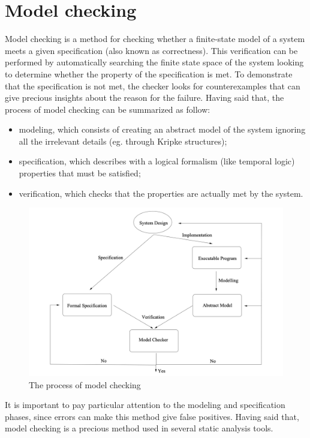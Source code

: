 \section{Model checking}
Model checking is a method for checking whether a finite-state model of a system meets a given specification (also known as correctness). This verification can be performed by automatically searching the finite state space of the system looking to determine whether the property of the specification is met. To demonstrate that the specification is not met, the checker looks for counterexamples that can give precious insights about the reason for the failure. Having said that, the process of model checking can be summarized as follow:
\begin{itemize}
  \item modeling, which consists of creating an abstract model of the system ignoring all the irrelevant details (eg. through Kripke structures);
  \item specification, which describes with a logical formalism (like temporal logic) properties that must be satisfied;
  \item verification, which checks that the properties are actually met by the system.
\end{itemize}
\begin{figure}[ht]
	\centering
	\includegraphics[width=1.0\textwidth]{Immagini/the_process_of_model_checking.jpg}
	\caption{The process of model checking \cite{ModelCheckingProcess}}
	\label{fig:one}
\end{figure}
It is important to pay particular attention to the modeling and specification phases, since errors can make this method give false positives.
Having said that, model checking is a precious method used in several static analysis tools. 

